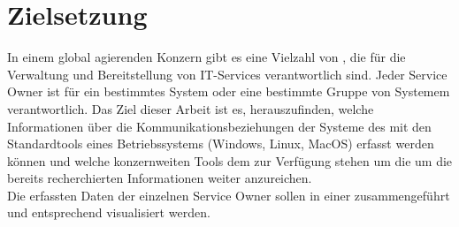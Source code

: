 \chapter{Zielsetzung}
\label{ch:Zielsetzung}
In einem global agierenden Konzern gibt es eine Vielzahl von \so, die für die Verwaltung und Bereitstellung von IT-Services verantwortlich sind. Jeder Service Owner ist für ein bestimmtes System oder eine bestimmte Gruppe von Systemem verantwortlich.
Das Ziel dieser Arbeit ist es, herauszufinden, welche Informationen über die Kommunikationsbeziehungen der Systeme des \so{}  mit den Standardtools eines Betriebssystems (Windows, Linux, MacOS) erfasst werden können und welche konzernweiten Tools dem \so zur Verfügung stehen um die um die bereits recherchierten Informationen weiter anzureichen.\\
Die erfassten Daten der einzelnen Service Owner sollen in einer \al zusammengeführt und entsprechend visualisiert werden.
